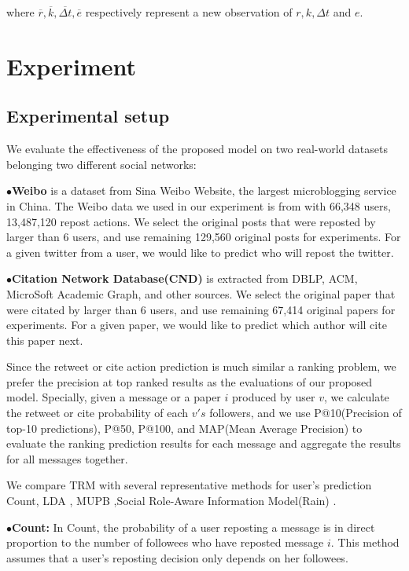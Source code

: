 \documentclass[runningheads,a4paper]{llncs}
\begin{document}
where $\overline r ,\overline k,\overline {\Delta t},\overline e$ respectively represent a new observation of $r,k,\Delta t $ and $e$.



\section{Experiment}
\subsection{Experimental setup}


We evaluate the effectiveness of the proposed model on two real-world datasets belonging two different social networks:


 \noindent$\bullet$\textbf{Weibo} is a dataset from Sina Weibo Website, the largest microblogging service in China. The Weibo data we used in our experiment is from \cite{tu2015prism} with 66,348 users, 13,487,120 repost actions. We select the original posts that were reposted by larger than 6 users, and use remaining 129,560 original posts for experiments. For a given twitter from a user, we would like to predict who will repost the twitter.

 \noindent$\bullet$\textbf{Citation Network Database(CND)}\cite{Zhang2014Role} is extracted from DBLP, ACM, MicroSoft Academic Graph, and other sources. We select the original paper that were citated by larger than 6 users, and use remaining 67,414 original papers for experiments. For a given paper, we would like to predict which author will cite this paper next.

Since the retweet or cite action prediction is much similar a ranking problem, we prefer the precision at top ranked results as the evaluations of our proposed model. Specially, given a message or a paper $i$ produced by user $v$, we calculate the retweet or cite probability of each $v's$ followers, and we use P@10(Precision of top-10 predictions), P@50, P@100, and MAP(Mean Average Precision) to evaluate the ranking prediction results for each message and aggregate the results for all messages together.

We compare TRM with several representative methods for user's  prediction Count, LDA \cite{blei2003latent}, MUPB \cite{xu2012modeling},Social Role-Aware Information Model(Rain) \cite{yang2015rain}.


\noindent$\bullet$\textbf{Count}\textbf{:} In Count, the probability of a user reposting a message is in direct proportion to the number of followees who have reposted message $i$. This method assumes that a user's reposting decision only depends on her followees.
\end{document}
